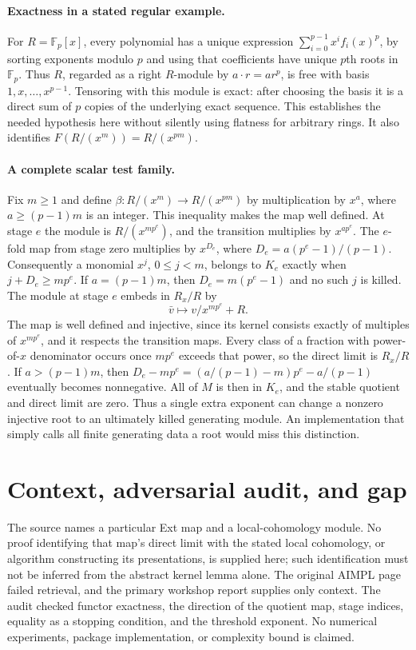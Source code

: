 \documentclass[11pt]{article}
\begin{document}
\paragraph{Exactness in a stated regular example.}
For $R=\mathbb F_p[x]$, every polynomial has a unique expression
$\sum_{i=0}^{p-1}x^i f_i(x)^p$, by sorting exponents modulo $p$ and using that
coefficients have unique $p$th roots in $\mathbb F_p$.
Thus $R$, regarded as a right $R$-module by $a\cdot r=ar^p$, is free with
basis $1,x,\ldots,x^{p-1}$. Tensoring with this module is exact: after choosing
the basis it is a direct sum of $p$ copies of the underlying exact sequence.
This establishes the needed hypothesis here without silently using flatness
for arbitrary rings. It also identifies $F(R/(x^m))=R/(x^{pm})$.

\paragraph{A complete scalar test family.}
Fix $m\ge1$ and define $\beta:R/(x^m)\to R/(x^{pm})$ by multiplication by
$x^a$, where $a\ge(p-1)m$ is an integer. This inequality makes the map
well defined. At stage $e$ the module is $R/(x^{mp^e})$, and the transition
multiplies by $x^{ap^e}$. The $e$-fold map from stage zero multiplies by
$x^{D_e}$, where $D_e=a(p^e-1)/(p-1)$. Consequently a monomial $x^j$,
$0\le j<m$, belongs to $K_e$ exactly when $j+D_e\ge mp^e$.
If $a=(p-1)m$, then $D_e=m(p^e-1)$ and no such $j$ is killed. The module
at stage $e$ embeds in $R_x/R$ by
\[
\bar v\longmapsto v/x^{mp^e}+R.
\]
The map is well defined and injective, since its kernel consists exactly of
multiples of $x^{mp^e}$, and it respects the transition maps. Every class of
a fraction with power-of-$x$ denominator occurs once $mp^e$ exceeds that
power, so the direct limit is $R_x/R$.
If $a>(p-1)m$, then
$D_e-mp^e=(a/(p-1)-m)p^e-a/(p-1)$ eventually becomes nonnegative.
All of $M$ is then in $K_e$, and the stable quotient and direct limit are zero.
Thus a single extra exponent can change a nonzero injective root to an
ultimately killed generating module. An implementation that simply calls
all finite generating data a root would miss this distinction.

\section{Context, adversarial audit, and gap}
The source names a particular Ext map and a local-cohomology module. No proof
identifying that map's direct limit with the stated local cohomology, or
algorithm constructing its presentations, is supplied here; such identification
must not be inferred from the abstract kernel lemma alone. The original AIMPL
page failed retrieval, and the primary workshop report supplies only context.
The audit checked functor exactness, the direction of the quotient map,
stage indices, equality as a stopping condition, and the threshold exponent.
No numerical experiments, package implementation, or complexity bound is claimed.
\end{document}
